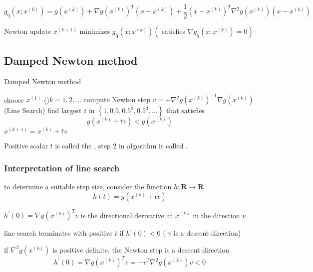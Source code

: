 \begin{definition}
    $$
g_{\mathrm{q}}\left(x ; x^{(k)}\right)=g\left(x^{(k)}\right)+\nabla g\left(x^{(k)}\right)^{T}\left(x-x^{(k)}\right)+\frac{1}{2}\left(x-x^{(k)}\right)^{T} \nabla^{2} g\left(x^{(k)}\right)\left(x-x^{(k)}\right)
$$
\end{definition}

Newton update $ x^{(k+1)} $ minimizes $ g_{\mathrm{q}}\left(x ; x^{(k)}\right)\left(\right. $ satisfies $ \left.\nabla g_{\mathrm{q}}\left(x ; x^{(k)}\right)=0\right) $


\subsection{Damped Newton method}

\begin{algorithm}
    \caption{Damped Newton method}
    choose $ x^{(1)} $\;
    \While(){$ k=1,2, \ldots $}{
        compute Newton step $ v=-\nabla^{2} g\left(x^{(k)}\right)^{-1} \nabla g\left(x^{(k)}\right) $\;
        (Line Search) find largest $ t $ in $ \left\{1,0.5,0.5^{2}, 0.5^{3}, \ldots\right\} $ that satisfies
        $$
        g\left(x^{(k)}+t v\right)<g\left(x^{(k)}\right)
        $$\;
        $ x^{(k+1)}=x^{(k)}+t v $\;
    }
\end{algorithm}

Positive scalar $ t $ is called the , step 2 in algorithm is called .

\subsubsection{Interpretation of line search} 

to determine a suitable step size, consider the function $ h: \mathbf{R} \rightarrow \mathbf{R} $
$$
h(t)=g\left(x^{(k)}+t v\right)
$$


$ h^{\prime}(0)=\nabla g\left(x^{(k)}\right)^{T} v $ is the directional derivative at $ x^{(k)} $ in the direction $ v $

line search terminates with positive $ t $ if $ h^{\prime}(0)<0 $ ( $ v $ is a descent direction)

if $ \nabla^{2} g\left(x^{(k)}\right) $ is positive definite, the Newton step is a descent direction
$$
h^{\prime}(0)=\nabla g\left(x^{(k)}\right)^{T} v=-v^{T} \nabla^{2} g\left(x^{(k)}\right) v<0
$$


